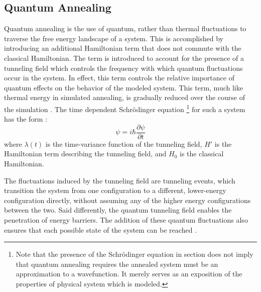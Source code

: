 \documentclass[11pt]{afthesis}
\begin{document}
	\subsection{Quantum Annealing}
	
	Quantum annealing is the use of quantum, rather than thermal fluctuations to traverse the free energy landscape of a system. This is accomplished by introducing an additional Hamiltonian term that does not commute with the classical Hamiltonian. The term is introduced to account for the presence of a tunneling field which controls the frequency with which quantum fluctuations occur in the system. In effect, this term controls the relative importance of quantum effects on the behavior of the modeled system. This term, much like thermal energy in simulated annealing, is gradually reduced over the course of the simulation \cite{das2005qakcs}. The time dependent Schrödinger equation \footnote{Note that the presence of the Schrödinger equation in section does not imply that quantum annealing requires the annealed system must be an approximation to a wavefunction. It merely serves as an exposition of the properties of physical system which is modeled.} for such a system has the form \cite{mukherjee2015multivariatesearchqa}: \begin{equation}
	[\lambda(t)H' + H_0]\psi = i\hbar \frac{\partial \psi}{\partial t}
	\end{equation} where \begin{math} \lambda(t) \end{math} is the time-variance function of the tunneling field, \begin{math} H' \end{math} is the Hamiltonian term describing the tunneling field, and \begin{math} H_0 \end{math} is the classical Hamiltonian. 
	
	The fluctuations induced by the tunneling field are tunneling events, which transition the system from one configuration to a different, lower-energy configuration directly, without assuming any of the higher energy configurations between the two. Said differently, the quantum tunneling field enables the penetration of energy barriers. The addition of these quantum fluctuations also ensures that each possible state of the system can be reached \cite{das2005qakcs}. 
	
	
\end{document}
